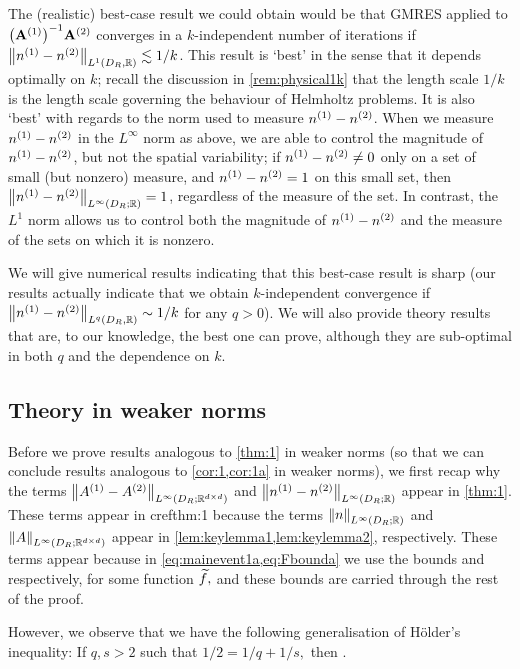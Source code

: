 The (realistic) best-case result we could obtain would be that GMRES applied to $\AmatoI\Amatt$ converges in a $k$-independent number of iterations if $\NLoDRRR{\nso-\nst} \lesssim 1/k$. This result is `best' in the sense that it depends optimally on $k$; recall the discussion in \cref{rem:physical1k} that the length scale $1/k$ is the length scale governing the behaviour of Helmholtz problems. It is also `best' with regards to the norm used to measure ${n}^{(1)}-{n}^{(2)}$. When we measure ${n}^{(1)}-{n}^{(2)}$ in the $L^\infty$ norm as above, we are able to control the magnitude of ${n}^{(1)}-{n}^{(2)}$, but not the spatial variability; if ${n}^{(1)}-{n}^{(2)} \neq 0$ only on a set of small (but nonzero) measure, and ${n}^{(1)}-{n}^{(2)}=1$ on this small set, then $\NLiDRRR{\nso-\nst} = 1$, regardless of the measure of the set. In contrast, the $L^1$ norm allows us to control both the magnitude of ${n}^{(1)}-{n}^{(2)}$ and the measure of the sets on which it is nonzero.

We will give numerical results indicating that this best-case result is sharp (our results actually indicate that we obtain $k$-independent convergence if $\NLqDRRR{\nso-\nst}\sim 1/k$ for any $q>0$). We will also provide theory results that are, to our knowledge, the best one can prove, although they are sub-optimal in both $q$ and the dependence on $k.$


\subsection{Theory in weaker norms}\label{sec:weakertheory}
Before we prove results analogous to \cref{thm:1} in weaker norms (so that we can conclude results analogous to \cref{cor:1,cor:1a} in weaker norms), we first recap why the terms  $\NLiDRRRdtd{\Aso-\Ast}$ and $\NLiDRRR{\nso-\nst}$ appear in \cref{thm:1}. These terms appear in cref{thm:1} because the terms $\NLiDRRR{n}$ and $\NLiDRRRdtd{A}$ appear in \cref{lem:keylemma1,lem:keylemma2}, respectively. These terms appear because in \cref{eq:mainevent1a,eq:Fbounda} we use the bounds
\beq\label{eq:keynbound}
 \leq {}\NLtDR{\ftilde}
\eeq
and
\beq\label{eq:keyAbound}
 \leq {}\NLtDR{\grad \ftilde}
\eeq
respectively, for some function $\widetilde{f},$ and these bounds are carried through the rest of the proof.

However, we observe that we have the following generalisation of H\"older's inequality: If $q,s > 2$ such that $1/2 = 1/q+1/s,$ then
\beq\label{eq:genholder}
\NLtDR{\vo\vt} \leq \NLqDR{\vo}\NLsDR{\vt}.
\eeq

